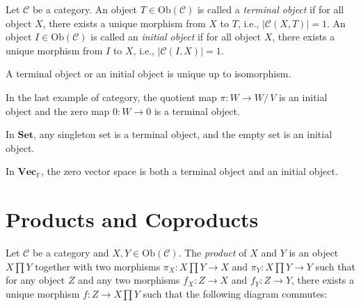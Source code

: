 \documentclass[
	11pt, %
	fleqn, %
	a4paper, %
]{LegrandOrangeBook}
\newcommand{\quotient}[2]{#1 /\, #2} %
\newcommand{\F}{\mathbb{F}} %
\newcommand{\C}{\mathcal{C}} %
\newcommand{\Set}{\textbf{Set}} %
\newcommand{\Vect}{\textbf{Vec}} %
\newcommand{\Ob}[1]{\text{Ob}(#1)} %
\begin{document}
\begin{definition}
    Let $\C$ be a category. An object $T \in \Ob{\C}$ is called a \emph{terminal object} if for all object $X$, there exists a unique morphism from $X$ to $T$, i.e., $|\C(X, T)| = 1$. An object $I \in \Ob{\C}$ is called an \emph{initial object} if for all object $X$, there exists a unique morphism from $I$ to $X$, i.e., $|\C(I, X)| = 1$.
\end{definition}

\begin{corollary}
    A terminal object or an initial object is unique up to isomorphism.
\end{corollary}

\begin{example}
    In the last example of category, the quotient map $\pi : W \to \quotient{W}{V}$ is an initial object and the zero map $0 : W \to 0$ is a terminal object.
\end{example}

\begin{example}
    In $\Set$, any singleton set is a terminal object, and the empty set is an initial object.
\end{example}

\begin{example}
    In $\Vect_{\F}$, the zero vector space is both a terminal object and an initial object.
\end{example}

\newpage

\section{Products and Coproducts}

\begin{definition}[Products]
    Let $\C$ be a category and $X, Y \in \Ob{\C}$. The \emph{product} of $X$ and $Y$ is an object $X \prod Y$ together with two morphisms $\pi_X : X \prod Y \to X$ and $\pi_Y : X \prod Y \to Y$ such that for any object $Z$ and any two morphisms $f_X : Z \to X$ and $f_Y : Z \to Y$, there exists a unique morphism $f : Z \to X \prod Y$ such that the following diagram commutes:
    \begin{center}
    \end{center}
\end{definition}
\end{document}
